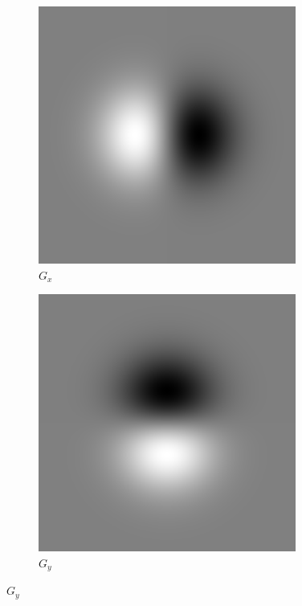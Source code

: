 \documentclass[thesis.tex]{subfiles}
\begin{document}
\begin{figure}[p]
	\begin{subfigure}[t]{0.23\textwidth}
		\includegraphics[width=\textwidth]{img/gaussianDerivative_1_0.png}
		\caption*{$G_{x}$}
	\end{subfigure}
	\begin{subfigure}[t]{0.23\textwidth}
		\includegraphics[width=\textwidth]{img/gaussianDerivative_0_1.png}
		\caption*{$G_{y}$}
	\end{subfigure}
	\vspace{2mm}
	

\end{figure}
\end{document}

